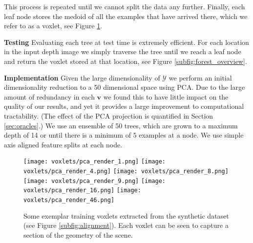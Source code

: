 \documentclass[10pt,twocolumn,letterpaper]{article}
\renewcommand{\paragraph}{\vspace{2pt}\noindent\textbf}
\begin{document}
This process is repeated until we cannot split the data any further.
Finally, each leaf node stores the medoid of all the examples that have arrived there, which we refer to as a voxlet, see Figure \ref{fig:voxlets}.


\paragraph{Testing}
Evaluating each tree at test time is extremely efficient.
For each location in the input depth image we simply traverse the tree until we reach a leaf node and return the voxlet stored at that location, see Figure \ref{subfig:forest_overview}.

\paragraph{Implementation}
Given the large dimensionality of $\mathcal{Y}$ we perform an initial dimensionality reduction to a 50 dimensional space using PCA.
Due to the large amount of redundancy in each $\mathbf{v}$ we found this to have little impact on the quality of our results, and yet it provides a large improvement to computational tractability.
(The effect of the PCA projection is quantified in Section \ref{sec:oracles}.)
We use an ensemble of 50 trees, which are grown to a maximum depth of 14 or until there is a minimum of 5 examples at a node.
We use simple axis aligned feature splits at each node.


\newcommand{\voxletsubwidth}{0.41\columnwidth}
\begin{figure}
     \texttt{[image: voxlets/pca\_render\_1.png]}
     \texttt{[image: voxlets/pca\_render\_4.png]}
     \texttt{[image: voxlets/pca\_render\_8.png]} \\
     \texttt{[image: voxlets/pca\_render\_9.png]}
     \texttt{[image: voxlets/pca\_render\_16.png]}
     \texttt{[image: voxlets/pca\_render\_46.png]}
     \caption{Some exemplar training voxlets extracted from the synthetic dataset (see Figure \ref{subfig:alignment}).
     Each voxlet can be seen to capture a section of the geometry of the scene.}
     \label{fig:voxlets}
\end{figure}



\pagedepth\maxdimen
\end{document}
